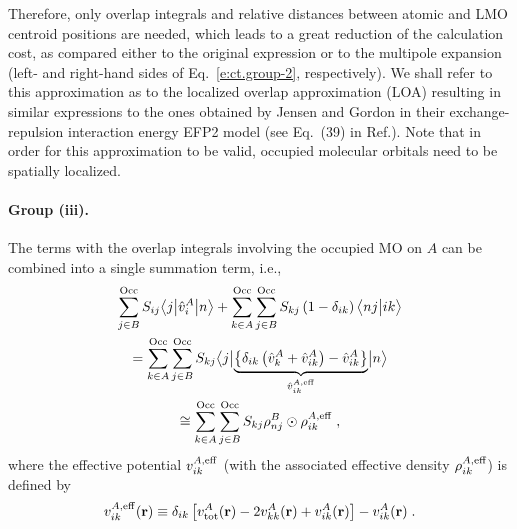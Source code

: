\documentclass[aip,jcp,amsmath,amssymb,reprint,floatfix]{revtex4-1}
\begin{document}
%
Therefore, only overlap integrals and relative distances between
atomic and LMO centroid positions are needed, which leads to a great reduction of the
calculation cost,
as compared either to the original expression or to the multipole expansion (left\hyp{} and right\hyp{}hand sides
of Eq.~\eqref{e:ct.group-2}, respectively).
We shall refer to this approximation as to
the localized overlap approximation (LOA) resulting
in similar expressions to the ones obtained by Jensen and Gordon
in their exchange\hyp{}repulsion interaction energy EFP2 model
(see Eq.~(39) in Ref.\cite{Jensen.Gordon.MolPhys.1996}). Note that in order for this approximation to be valid,
occupied molecular orbitals need to be spatially localized.

\paragraph{Group (iii).}
The terms with the overlap integrals involving the occupied MO on $A$
can be combined into a single summation term, i.e.,
\begin{multline} \label{e:ct.group-iii}
        \sum_{j\in B}^{\rm Occ} S_{ij} \tBraKet{j}{\hat{v}^A_{i} }{n}  
     + \sum_{k\in A}^{\rm Occ} \sum_{j\in B}^{\rm Occ}  
        S_{kj} \left( 1 - \delta_{ik} \right)
        \BraKet{nj}{ik} \\ = 
 \sum_{k\in A}^{\rm Occ} 
 \sum_{j\in B}^{\rm Occ}
 S_{kj} 
 \tBraKet{j}{
 \underbrace{
 \left\{ 
  \delta_{ik} \left( \hat{v}^A_{k} + \hat{v}^A_{ik} \right)   - \hat{v}^A_{ik}
 \right\} 
  }_{\hat{v}^{A,{\rm eff}}_{ik}}
 }{n}  \\ \cong 
%
  \sum_{k\in A}^{\rm Occ} 
 \sum_{j\in B}^{\rm Occ}
 S_{kj} 
 \rho_{nj}^B \odot \rho^{A,{\rm eff}}_{ik} \;,
\end{multline}
%
where the effective potential ${v}^{A,{\rm eff}}_{ik}$ (with the associated 
effective density $\rho^{A,{\rm eff}}_{ik}$) 
is defined by
%
\begin{equation} \label{e:ct.group-iii.oep}
 {v}^{A,{\rm eff}}_{ik}({\bf r}) \equiv
 \delta_{ik} 
 \left[
  v^A_{\rm tot} ({\bf r}) - 2 v^A_{kk} ({\bf r}) + v^A_{ik} ({\bf r})
 \right] 
  - v^A_{ik} ({\bf r}) \;.
\end{equation}
%
\end{document}
